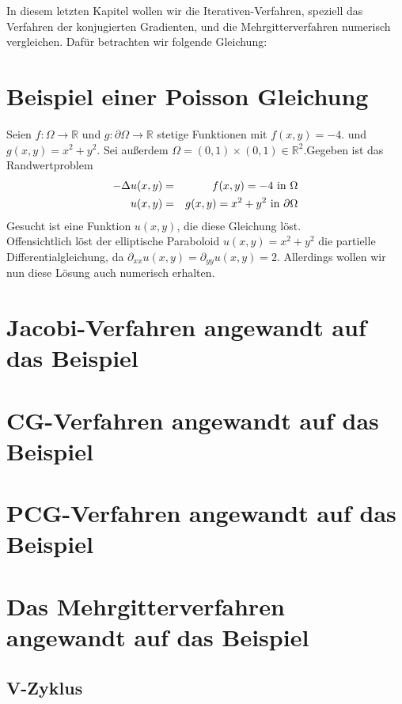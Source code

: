 In diesem letzten Kapitel wollen wir die Iterativen-Verfahren, speziell das Verfahren der konjugierten Gradienten, und die Mehrgitterverfahren numerisch vergleichen. Dafür betrachten wir folgende Gleichung:

\section{Beispiel einer Poisson Gleichung}\label{s.Beispiel einer Poisson Gleichung}

Seien $f: \Omega \rightarrow \mathbb{R}$ und $g: \partial\Omega \rightarrow \mathbb{R}$ stetige Funktionen mit $f(x,y) = -4.$ und $g(x,y) = x^{2} + y^{2}$. Sei außerdem $\Omega = (0,1)\times(0,1) \in \mathbb{R}^{2}$.Gegeben ist das Randwertproblem
\begin{eqnarray}
        -\Delta u(x,y) &=& f(x,y) = -4 \textnormal{ in } \Omega \\
    u(x,y) &=& g(x,y) = x^{2} + y^{2} \textnormal{ in } \partial \Omega
\end{eqnarray}
Gesucht ist eine Funktion $u(x,y)$, die diese Gleichung löst. \\
Offensichtlich löst der elliptische Paraboloid $u(x,y) = x^{2} + y^{2}$ die partielle Differentialgleichung, da $\partial_{xx}u(x,y) = \partial_{yy}u(x,y) = 2$. Allerdings wollen wir nun diese Lösung auch numerisch erhalten.

\section{Jacobi-Verfahren angewandt auf das Beispiel}\label{s.Jacobi mit Beispiel}

\section{CG-Verfahren angewandt auf das Beispiel}\label{s.CG mit Beispiel}

\section{PCG-Verfahren angewandt auf das Beispiel}\label{s.PCG mit Beispiel}

\section{Das Mehrgitterverfahren angewandt auf das Beispiel}\label{s.Multigrid mit Beispiel}

\subsection{V-Zyklus}\label{ss.V-Zyklus mit Beispiel}

